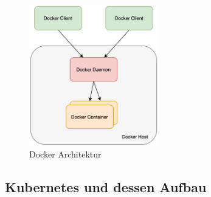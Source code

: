 \begin{figure}[bth] 
	\centering
	\includegraphics[width=0.5\textwidth]{Graphics/DockerArchitektur.png}
	\caption{Docker Architektur}
\end{figure}

\subsection{Kubernetes und dessen Aufbau}\label{sub-kubernetes}

